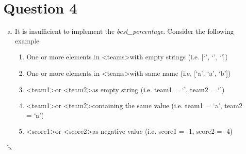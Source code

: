 \documentclass[12pt]{article}
\begin{document}
\bigskip

\section*{Question 4}
\begin{enumerate}[a.]
    \item

    It is insufficient to implement the \textit{best\_percentage}. Consider the
    following example

    \bigskip

    \begin{enumerate}[1.]
        \item One or more elements in \textless teams\textgreater with empty
        strings (i.e. [`', `', `'])
        \item One or more elements in \textless teams\textgreater with same
        name (i.e. [`a', `a', `b'])
        \item \textless team1\textgreater or \textless team2\textgreater as
        empty string (i.e. team1 = `', team2 = `')
        \item \textless team1\textgreater or \textless team2\textgreater containing
        the same value (i.e. team1 = `a', team2 = `a')
        \item \textless score1\textgreater or \textless score2\textgreater as
        negative value (i.e. score1 = -1, score2 = -4)
    \end{enumerate}

    \item


\end{enumerate}
\end{document}
